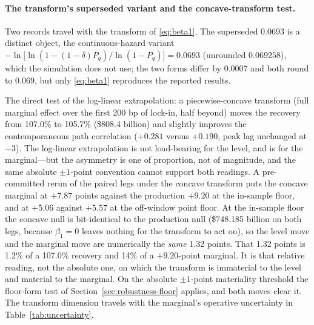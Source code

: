 \documentclass[12pt]{article}
\begin{document}
\paragraph{The transform's superseded variant and the concave-transform test.}
Two records travel with the transform of \eqref{eq:beta1}. The superseded $0.0693$ is a distinct object, the continuous-hazard variant $-\ln\!\big[\ln(1-(1-\delta)P_q)/\ln(1-P_q)\big] = 0.0693$ (unrounded $0.069258$), which the simulation does not use; the two forms differ by $0.0007$ and both round to $0.069$, but only \eqref{eq:beta1} reproduces the reported results.

The direct test of the log-linear extrapolation: a piecewise-concave transform (full marginal effect over the first 200 bp of lock-in, half beyond) moves the recovery from 107.0\% to 105.7\% (\$808.4 billion) and slightly improves the contemporaneous path correlation ($+0.281$ versus $+0.190$, peak lag unchanged at $-3$). The log-linear extrapolation is not load-bearing for the level, and is for the marginal---but the asymmetry is one of proportion, not of magnitude, and the same absolute $\pm 1$-point convention cannot support both readings. A pre-committed rerun of the paired legs under the concave transform puts the concave marginal at $+7.87$ points against the production $+9.20$ at the in-sample floor, and at $+5.06$ against $+5.57$ at the off-window point floor. At the in-sample floor the concave null is bit-identical to the production null (\$748.185 billion on both legs, because $\beta_1 = 0$ leaves nothing for the transform to act on), so the level move and the marginal move are numerically the \emph{same} 1.32 points. That 1.32 points is 1.2\% of a 107.0\% recovery and 14\% of a $+9.20$-point marginal. It is that relative reading, not the absolute one, on which the transform is immaterial to the level and material to the marginal. On the absolute $\pm 1$-point materiality threshold the floor-form test of Section~\ref{sec:robustness-floor} applies, and both moves clear it. The transform dimension travels with the marginal's operative uncertainty in Table~\ref{tab:uncertainty}.
\end{document}
